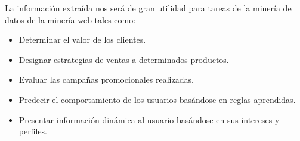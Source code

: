 \documentclass[12pt, twoside, openright]{report} %
\begin{document}
La información extraída nos será de gran utilidad para tareas de la minería de datos de la minería web tales como:
\begin{itemize}
	\item Determinar el valor de los clientes.
	\item Designar estrategias de ventas a determinados productos.
	\item Evaluar las campañas promocionales realizadas.
	\item Predecir el comportamiento de los usuarios basándose en reglas aprendidas.
	\item Presentar información dinámica al usuario basándose en sus intereses y perfiles.
\end{itemize}
\end{document}
